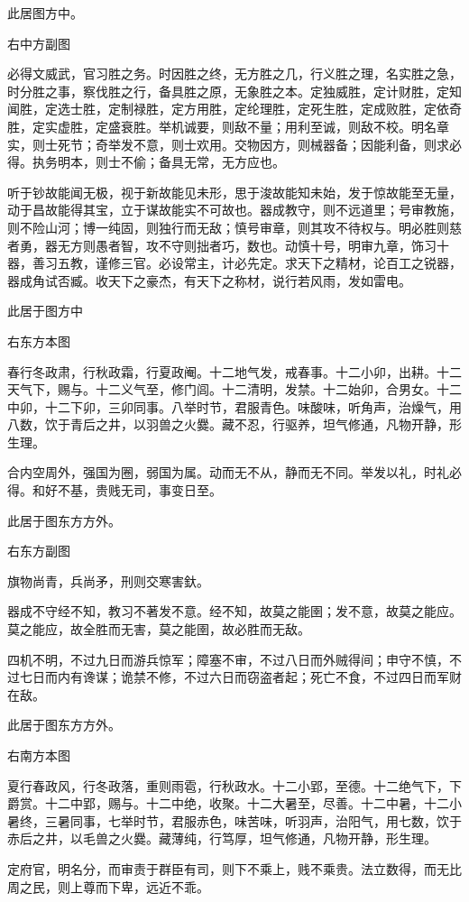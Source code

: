 \documentclass[]{article}
\begin{document}
此居图方中。

右中方副图

必得文威武，官习胜之务。时因胜之终，无方胜之几，行义胜之理，名实胜之急，时分胜之事，察伐胜之行，备具胜之原，无象胜之本。定独威胜，定计财胜，定知闻胜，定选士胜，定制禄胜，定方用胜，定纶理胜，定死生胜，定成败胜，定依奇胜，定实虚胜，定盛衰胜。举机诚要，则敌不量；用利至诚，则敌不校。明名章实，则士死节；奇举发不意，则士欢用。交物因方，则械器备；因能利备，则求必得。执务明本，则士不偷；备具无常，无方应也。

听于钞故能闻无极，视于新故能见未形，思于浚故能知未始，发于惊故能至无量，动于昌故能得其宝，立于谋故能实不可故也。器成教守，则不远道里；号审教施，则不险山河；博一纯固，则独行而无敌；慎号审章，则其攻不待权与。明必胜则慈者勇，器无方则愚者智，攻不守则拙者巧，数也。动慎十号，明审九章，饰习十器，善习五教，谨修三官。必设常主，计必先定。求天下之精材，论百工之锐器，器成角试否臧。收天下之豪杰，有天下之称材，说行若风雨，发如雷电。

此居于图方中

右东方本图

春行冬政肃，行秋政霜，行夏政阉。十二地气发，戒春事。十二小卯，出耕。十二天气下，赐与。十二义气至，修门闾。十二清明，发禁。十二始卯，合男女。十二中卯，十二下卯，三卯同事。八举时节，君服青色。味酸味，听角声，治燥气，用八数，饮于青后之井，以羽兽之火爨。藏不忍，行驱养，坦气修通，凡物开静，形生理。

合内空周外，强国为圈，弱国为属。动而无不从，静而无不同。举发以礼，时礼必得。和好不基，贵贱无司，事变日至。

此居于图东方方外。

右东方副图

旗物尚青，兵尚矛，刑则交寒害釱。

器成不守经不知，教习不著发不意。经不知，故莫之能圉；发不意，故莫之能应。莫之能应，故全胜而无害，莫之能圉，故必胜而无敌。

四机不明，不过九日而游兵惊军；障塞不审，不过八日而外贼得间；申守不慎，不过七日而内有谗谋；诡禁不修，不过六日而窃盗者起；死亡不食，不过四日而军财在敌。

此居于图东方方外。

右南方本图

夏行春政风，行冬政落，重则雨雹，行秋政水。十二小郢，至德。十二绝气下，下爵赏。十二中郢，赐与。十二中绝，收聚。十二大暑至，尽善。十二中暑，十二小暑终，三暑同事，七举时节，君服赤色，味苦味，听羽声，治阳气，用七数，饮于赤后之井，以毛兽之火爨。藏薄纯，行笃厚，坦气修通，凡物开静，形生理。

定府官，明名分，而审责于群臣有司，则下不乘上，贱不乘贵。法立数得，而无比周之民，则上尊而下卑，远近不乖。
\end{document}
